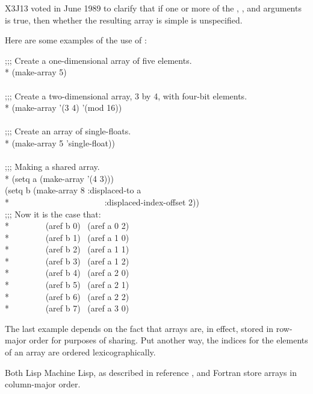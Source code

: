 \begin{defun}[Function]
\begin{newer}
X3J13 voted in June 1989
to clarify that if one or more of the , ,
and  arguments is true, then whether the resulting
array is simple is unspecified.
\end{newer}

Here are some examples of the use of :
\begin{lisp}
;;; Create a one-dimensional array of five elements. \\*
(make-array 5) \\
 \\
;;; Create a two-dimensional array, 3 by 4, with four-bit elements. \\*
(make-array '(3 4)  '(mod 16)) \\
 \\
;;; Create an array of single-floats.\\*
(make-array 5  'single-float)) \\
\\
;;; Making a shared array. \\*
(setq a (make-array '(4 3))) \\
(setq b (make-array 8 :displaced-to a \\*
~~~~~~~~~~~~~~~~~~~~~~:displaced-index-offset 2)) \\
;;; Now it is the case that: \\*
~~~~~~~~(aref b 0) \EQ\ (aref a 0 2) \\*
~~~~~~~~(aref b 1) \EQ\ (aref a 1 0) \\*
~~~~~~~~(aref b 2) \EQ\ (aref a 1 1) \\*
~~~~~~~~(aref b 3) \EQ\ (aref a 1 2) \\*
~~~~~~~~(aref b 4) \EQ\ (aref a 2 0) \\*
~~~~~~~~(aref b 5) \EQ\ (aref a 2 1) \\*
~~~~~~~~(aref b 6) \EQ\ (aref a 2 2) \\*
~~~~~~~~(aref b 7) \EQ\ (aref a 3 0)
\end{lisp}
The last example depends on the fact that arrays are, in effect,
stored in row-major order for purposes of sharing.  Put another way,
the indices for the elements of an array are ordered
lexicographically.

\beforenoterule
\begin{incompatibility}
Both Lisp Machine Lisp, as described in reference \cite{BLUE-LISPM},
and Fortran \cite{DRAFT-FORTRAN-77,ANSI-FORTRAN-77} store arrays in
column-major order.
\end{incompatibility}
\afternoterule
\end{defun}

